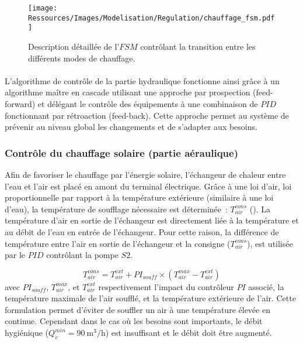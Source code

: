 \begin{figure}
    \centering
    \texttt{[image: Ressources/Images/Modelisation/Regulation/chauffage\_fsm.pdf]}
    \caption{Description détaillée de l’$FSM$ contrôlant la transition entre
             les différents modes de chauffage.}
    \label{fig:automate_chauffage}
\end{figure}


\paragraph{} %
\label{par:conclusion_algo}
L’algorithme de contrôle de la partie hydraulique fonctionne ainsi grâce à un algorithme
maître en cascade utilisant une approche par prospection (feed-forward) et délégant le
contrôle des équipements à une combinaison de $PID$ fonctionnant par rétroaction (feed-back).
Cette approche permet au système de prévenir au niveau global les changements et de
s’adapter aux besoins.


\subsubsection{Contrôle du chauffage solaire (partie aéraulique)} %
\label{ssub:controle_du_chauffage_solaire}
Afin de favoriser le chauffage par l’énergie solaire, l’échangeur de chaleur entre l’eau
et l’air est placé en amont du terminal électrique. Grâce à une loi d’air, loi
proportionnelle par rapport à la température extérieure (similaire à une loi d’eau), la
température de soufflage nécessaire est déterminée~: $T_{air}^{cons}$ ().
La température d’air en sortie de l’échangeur est directement liée à la température et au
débit de l’eau en entrée de l’échangeur. Pour cette raison, la différence de température
entre l’air en sortie de l’échangeur et la consigne ($T_{air}^{cons}$), est utilisée
par le $PID$ contrôlant la pompe $S2$.

\begin{equation}\label{eq:temp_soufflage}
    T_{air}^{cons} = T_{air}^{ext} + PI_{souff} \times (T_{air}^{max} - T_{air}^{ext})
\end{equation}
avec $PI_{souff}$, $T_{air}^{max}$, et $T_{air}^{ext}$ respectivement l’impact du
contrôleur $PI$ associé, la température maximale de l’air soufflé, et la température
extérieure de l’air. Cette formulation permet d’éviter de souffler un air à une
température élevée en continue. Cependant dans le cas où les besoins sont importants, le
débit hygiénique ($Q_{v}^{min} = \SI[per-mode=symbol]{90}{\meter\cubed\per\hour}$) est insuffisant
et le débit doit être augmenté.

